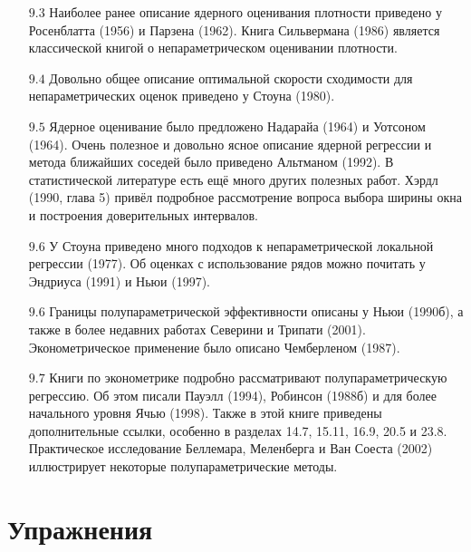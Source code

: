 \begin{itemize}
\item [$9.3$] Наиболее ранее описание ядерного оценивания плотности приведено у Росенблатта (1956) и Парзена (1962). Книга Сильвермана (1986) является классической книгой о непараметрическом оценивании плотности.
\item [$9.4$] Довольно общее описание оптимальной скорости сходимости для непараметрических оценок приведено у Стоуна (1980).
\item [$9.5$] Ядерное оценивание было предложено Надарайа (1964) и Уотсоном (1964). Очень полезное и довольно ясное описание ядерной регрессии и метода ближайших соседей было приведено Альтманом (1992). В статистической литературе есть ещё много других полезных работ. Хэрдл (1990, глава 5) привёл подробное рассмотрение вопроса выбора ширины окна и построения доверительных интервалов.
\item [$9.6$] У Стоуна приведено много подходов к непараметрической локальной регрессии (1977). Об оценках с использование рядов можно почитать у Эндриуса (1991) и Ньюи (1997). 
\item [$9.6$] Границы полупараметрической эффективности описаны у Ньюи (1990б), а также в более недавних работах Северини и Трипати (2001). Эконометрическое применение было описано Чемберленом (1987).
\item [$9.7$] Книги по эконометрике подробно рассматривают полупараметрическую регрессию. Об этом писали Пауэлл (1994), Робинсон (1988б) и для более начального уровня Ячью (1998). Также в этой книге приведены дополнительные ссылки, особенно в разделах 14.7, 15.11, 16.9, 20.5 и 23.8. Практическое исследование Беллемара, Меленберга и Ван Соеста (2002) иллюстрирует некоторые полупараметрические методы. 
\end{itemize}


\section{Упражнения}

